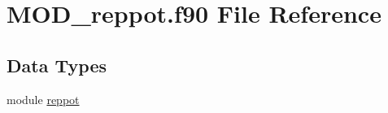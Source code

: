 \hypertarget{MOD__reppot_8f90}{\section{M\-O\-D\-\_\-reppot.\-f90 File Reference}
\label{MOD__reppot_8f90}
}
\subsection*{Data Types}
\begin{DoxyCompactItemize}
\item 
module \hyperlink{classreppot}{reppot}
\end{DoxyCompactItemize}

